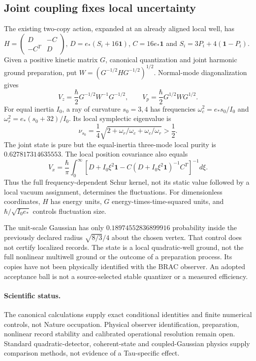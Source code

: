 \subsection{Joint coupling fixes local uncertainty}
The existing two-copy action, expanded at an already aligned local well,
has $H=\left(\begin{smallmatrix}D&-C\\-C^T&D\end{smallmatrix}\right)$,
$D=e_*(S_i+16\mathbf1)$, $C=16e_*\mathbf1$ and
$S_i=3P_i+4(\mathbf1-P_i)$. Given a positive kinetic matrix $G$,
canonical quantization and joint harmonic ground preparation, put
$W=(G^{-1/2}HG^{-1/2})^{1/2}$. Normal-mode diagonalization gives
\begin{equation}
 V_z=\frac\hbar2G^{-1/2}W^{-1}G^{-1/2},\qquad
 V_p=\frac\hbar2G^{1/2}WG^{1/2}.
\end{equation}
For equal inertia $I_0$, a ray of curvature $s_0=3,4$ has frequencies
$\omega_c^2=e_*s_0/I_0$ and $\omega_r^2=e_*(s_0+32)/I_0$. Its local
symplectic eigenvalue is
\begin{equation}
 \nu_{s_0}=\frac14\sqrt{2+\omega_r/\omega_c+\omega_c/\omega_r}>\frac12.
\end{equation}
The joint state is pure but the equal-inertia three-mode local purity is
$0.627817314635553$. The local position covariance also equals
\begin{equation}
 V_x=\frac\hbar\pi\int_0^\infty
 \left[D+I_0\xi^2\mathbf1-C(D+I_0\xi^2\mathbf1)^{-1}C^T\right]^{-1}d\xi.
\end{equation}
Thus the full frequency-dependent Schur kernel, not its static value followed
by a local vacuum assignment, determines the fluctuations. For dimensionless
coordinates, $H$ has energy units, $G$ energy-times-time-squared units, and
$\hbar/\sqrt{I_0e_*}$ controls fluctuation size.

The unit-scale Gaussian has only $0.18974552836899916$ probability inside
the previously declared radius $\sqrt{8/3}/4$ about the chosen vertex.
That control does not certify localized records. The state is a local
quadratic-well ground, not the full nonlinear multiwell ground or the
outcome of a preparation process. Its copies have not been physically
identified with the BRAC observer. An adopted acceptance ball is not a
source-selected stable quantizer or a measured efficiency.

\paragraph{Scientific status.}
The canonical calculations supply exact conditional identities and finite
numerical controls, not Nature occupation. Physical observer identification,
preparation, nonlinear record stability and calibrated operational resolution
remain open. Standard quadratic-detector, coherent-state and coupled-Gaussian
physics supply comparison methods, not evidence of a Tau-specific effect.
